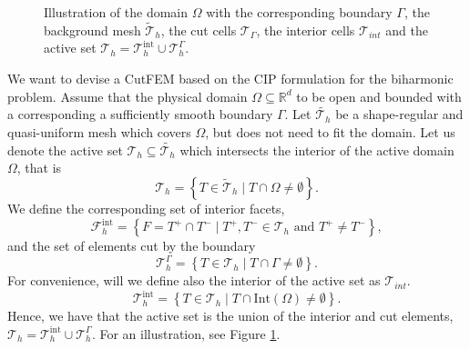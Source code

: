 \begin{figure}[h!]
{


}


\caption{Illustration of the domain $\Omega$ with the corresponding boundary $\Gamma$, the background mesh $\widetilde{\mathcal{T}}_{h} $,  the cut cells $\mathcal{T} _{\Gamma }$, the interior cells $\mathcal{T} _{int}$ and the active set $\mathcal{T} _{h} =
\mathcal{T}^{ \mathrm{int}  }_{h} \cup \mathcal{T}_{h }^{ \Gamma  }  $. }
\label{fig:background_mesh}
\end{figure}


We want to devise a CutFEM based on the CIP formulation for the biharmonic problem. Assume that the physical domain $\Omega \subseteq    \mathbb{R} ^d$ to be open and bounded with a corresponding a sufficiently smooth boundary $\Gamma  $.
 Let $\widetilde{\mathcal{T}_{h} } $ be a shape-regular and quasi-uniform mesh which covers $\Omega $, but does not need to fit the
domain. Let us denote the active set $\mathcal{T} _{h} \subseteq \widetilde{\mathcal{T}_{h}}$ which intersects the interior of the active domain $\Omega $, that is
\begin{equation}
\label{eq:active_set}
\mathcal{T} _{h} = \left\{ T \in \widetilde{\mathcal{T} }_{h}  \mid  T \cap \Omega   \neq \emptyset    \right\}.
\end{equation}
We define the corresponding set of interior facets, \[
    \mathcal{F} _{h}^{\mathrm{int} } = \left\{ F = T^{+} \cap T^{-}  \mid  T^{+}, T^{-} \in \mathcal{T} _{h} \text{ and } T^{+} \neq T^{-} \right\},
\]
and the set of elements cut by the boundary \[
\mathcal{T}_{h} ^{\Gamma } = \left\{ T \in \mathcal{T} _{h}   \mid  T \cap \Gamma \neq \emptyset  \right\}.
\]
For convenience, will we define also the interior of the active set as $\mathcal{T} _{int}$.
\[
\mathcal{T} ^{\mathrm{int} }_{h} = \left\{ T \in \mathcal{T} _{h}   \mid  T \cap  \mathrm{Int}(\Omega ) \neq \emptyset  \right\}.
\]
Hence, we have that the active set is the union of the interior and cut elements, $\mathcal{T} _{h} = \mathcal{T}_{h} ^{\mathrm{int} } \cup  \mathcal{T} ^{\Gamma }_{h}$. For an illustration, see Figure \ref{fig:background_mesh}.



